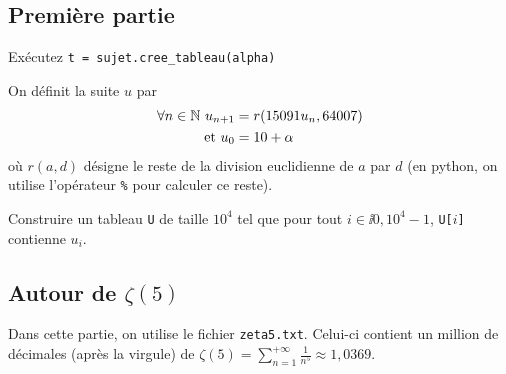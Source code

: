 \subsection{Première partie}



Exécutez \texttt{t = sujet.cree\_tableau(alpha)}






On définit la suite $u$ par
\begin{align*}
\forall n\in \mathbb{N} \ u_{n+1} &= r(15091 u_{n},64007)\\
\text{et }  u_{0} & = 10 + \alpha
\end{align*}
où $r(a,d)$ désigne le reste de la division euclidienne de $a$ par
$d$ (en python, on utilise l'opérateur \texttt{\%} pour calculer ce reste).

Construire un tableau \texttt{U} de taille $10^{4}$ tel que pour tout $i\in
\ii{0,10^{4}-1}$, \texttt{U[$i$]} contienne $u_{i}$.


\subsection{Autour de $\zeta(5)$}

Dans cette partie, on utilise le fichier \texttt{zeta5.txt}. Celui-ci
contient un million de décimales (après la virgule) de $\zeta(5) =
\sum_{n=1}^{+\infty} \frac{1}{n^{5}} \approx 1,0369$.

